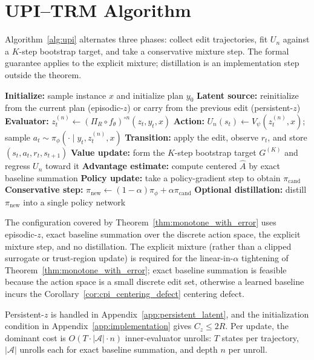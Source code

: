 \documentclass{article}
\theoremstyle{plain}
\theoremstyle{definition}
\theoremstyle{remark}
\begin{document}
\section{UPI--TRM Algorithm}
\label{sec:algorithm}
Algorithm~\ref{alg:upi} alternates three phases: collect edit trajectories, fit $U_n$ against a $K$-step bootstrap target, and take a conservative mixture step. The formal guarantee applies to the explicit mixture; distillation is an implementation step outside the theorem.

\begin{algorithm}[t]
\small
\caption{One UPI--TRM update on the plan-space MDP}
\label{alg:upi}
\begin{algorithmic}[1]
\STATE \textbf{Initialize:} sample instance $x$ and initialize plan $y_0$
\STATE \textbf{Latent source:} reinitialize from the current plan (episodic-$z$) or carry from the previous edit (persistent-$z$)
  \STATE \textbf{Evaluator:} $z_t^{(n)} \gets (\Pi_R \circ f_\theta)^{\circ n}(z_t,y_t,x)$
  \STATE \textbf{Action:} $U_n(s_t) \gets V_\psi(z_t^{(n)},x)$; sample $a_t\sim\pi_\phi(\cdot\mid y_t,z_t^{(n)},x)$
  \STATE \textbf{Transition:} apply the edit, observe $r_t$, and store $(s_t,a_t,r_t,s_{t+1})$
\ENDFOR
\STATE \textbf{Value update:} form the $K$-step bootstrap target $G^{(K)}$ and regress $U_n$ toward it
\STATE \textbf{Advantage estimate:} compute centered $\widehat A$ by exact baseline summation
\STATE \textbf{Policy update:} take a policy-gradient step to obtain $\pi_{\mathrm{cand}}$
\STATE \textbf{Conservative step:} $\pi_{\mathrm{new}} \gets (1-\alpha)\pi_\phi+\alpha\pi_{\mathrm{cand}}$
\STATE \textbf{Optional distillation:} distill $\pi_{\mathrm{new}}$ into a single policy network
\end{algorithmic}
\end{algorithm}

The configuration covered by Theorem~\ref{thm:monotone_with_error} uses episodic-$z$, exact baseline summation over the discrete action space, the explicit mixture step, and no distillation. The explicit mixture (rather than a clipped surrogate or trust-region update) is required for the linear-in-$\alpha$ tightening of Theorem~\ref{thm:monotone_with_error}; exact baseline summation is feasible because the action space is a small discrete edit set, otherwise a learned baseline incurs the Corollary~\ref{cor:cpi_centering_defect} centering defect.

Persistent-$z$ is handled in Appendix~\ref{app:persistent_latent}, and the initialization condition in Appendix~\ref{app:implementation} gives $C_z\le 2R$. Per update, the dominant cost is $O(T \cdot |\mathcal A| \cdot n)$ inner-evaluator unrolls: $T$ states per trajectory, $|\mathcal A|$ unrolls each for exact baseline summation, and depth $n$ per unroll.
\end{document}
